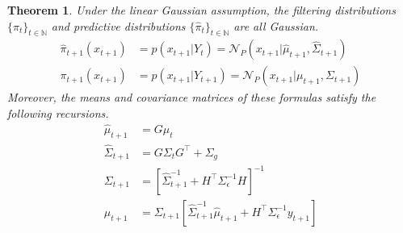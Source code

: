 \documentclass[12pt]{article}
\newtheorem{thm}{Theorem}
\begin{document}
\begin{thm} \label{Kalman_Filter}
Under the linear Gaussian assumption, the filtering distributions $\{\pi_t\}_{t \in \mathbb{N}}$ and predictive distributions $\{\hat{\pi}_{t}\}_{t \in \mathbb{N}}$ are all 
Gaussian. 
\begin{align*}
\hat{\pi}_{t+1}(x_{t+1}) &= p(x_{t+1}|Y_{t}) = \mathcal{N}_P(x_{t+1}|\hat{\mu}_{t+1}, \hat{\Sigma}_{t+1}) \\
\pi_{t+1}(x_{t+1}) &= p(x_{t+1}|Y_{t+1}) = \mathcal{N}_P(x_{t+1}|\mu_{t+1}, \Sigma_{t+1})
\end{align*}
Moreover, the means and covariance matrices of these formulas satisfy the following recursions. 
\begin{align*}
\hat{\mu}_{t + 1} &= G \mu_{t} \\
\hat{\Sigma}_{t + 1} &= G \Sigma_t G^\top + \Sigma_g \\
\Sigma_{t + 1} &= \left[\hat{\Sigma}^{-1}_{t + 1} + H^\top \Sigma_{\epsilon}^{-1} H \right]^{-1} \\
\mu_{t + 1} &= \Sigma_{t + 1} \left[\hat{\Sigma}^{-1}_{t + 1}\hat{\mu}_{t + 1} + H^\top \Sigma_{\epsilon}^{-1} y_{t+1} \right] 
\end{align*}
\end{thm}
\end{document}
